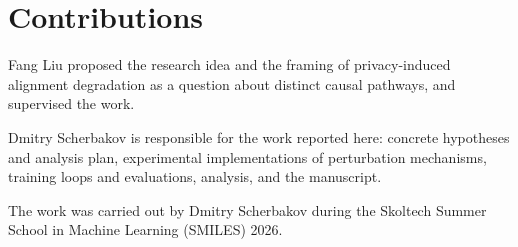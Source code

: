 \section*{Contributions}
Fang Liu proposed the research idea and the framing of privacy-induced alignment degradation as a question about distinct causal pathways,
and supervised the work.

Dmitry Scherbakov is responsible for the work reported here:
concrete hypotheses and analysis plan,
experimental implementations of perturbation mechanisms,
training loops and evaluations,
analysis,
and the manuscript.

The work was carried out by Dmitry Scherbakov during the Skoltech Summer School in Machine Learning (SMILES) 2026.
